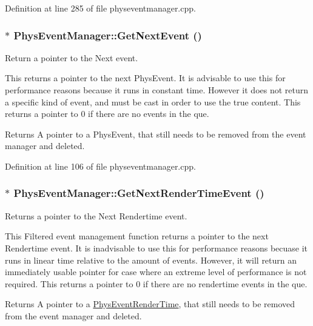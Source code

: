Definition at line 285 of file physeventmanager.cpp.

\hypertarget{classPhysEventManager_a1ab0da9e37f43c2c0d5af1dae26dcaf2}{
\subsubsection[{GetNextEvent}]{ $\ast$ PhysEventManager::GetNextEvent ()}}
\label{d5/dd7/classPhysEventManager_a1ab0da9e37f43c2c0d5af1dae26dcaf2}


Return a pointer to the Next event. 

This returns a pointer to the next PhysEvent. It is advisable to use this for performance reasons because it runs in constant time. However it does not return a specific kind of event, and must be cast in order to use the true content. This returns a pointer to 0 if there are no events in the que. \begin{DoxyReturn}{Returns}
A pointer to a PhysEvent, that still needs to be removed from the event manager and deleted. 
\end{DoxyReturn}


Definition at line 106 of file physeventmanager.cpp.

\hypertarget{classPhysEventManager_a1f2d0506ce816176913e5bdfaa9fd724}{
\subsubsection[{GetNextRenderTimeEvent}]{ $\ast$ PhysEventManager::GetNextRenderTimeEvent ()}}
\label{d5/dd7/classPhysEventManager_a1f2d0506ce816176913e5bdfaa9fd724}


Returns a pointer to the Next Rendertime event. 

This Filtered event management function returns a pointer to the next Rendertime event. It is inadvisable to use this for performance reasons becuase it runs in linear time relative to the amount of events. However, it will return an immediately usable pointer for case where an extreme level of performance is not required. This returns a pointer to 0 if there are no rendertime events in the que. \begin{DoxyReturn}{Returns}
A pointer to a \hyperlink{classPhysEventRenderTime}{PhysEventRenderTime}, that still needs to be removed from the event manager and deleted. 
\end{DoxyReturn}



